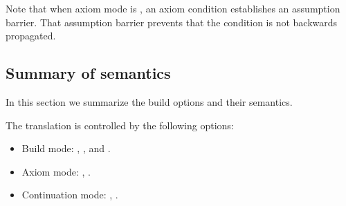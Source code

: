 Note that when axiom mode is , an axiom condition establishes
an assumption barrier. That assumption barrier prevents that the condition
is not backwards propagated.

\subsection{Summary of semantics}

In this section we summarize the build options and their semantics.

The translation is controlled by the following options:

\begin{itemize}
  \item Build mode: , , and .
  \item Axiom mode: , .
  \item Continuation mode: , .
\end{itemize}

